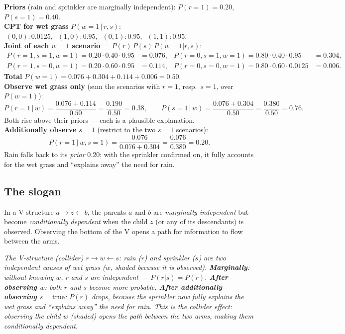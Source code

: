 \documentclass[11pt, a4paper]{article}
\begin{document}
\begin{exbox}
\textbf{Priors} (rain and sprinkler are marginally independent):
$P(r{=}1)=0.20$, $P(s{=}1)=0.40$.\\[0.2em]
\textbf{CPT for wet grass} $P(w{=}1\,|\,r,s)$:
$\;(0,0)\!: 0.0125,\;\;(1,0)\!: 0.95,\;\;(0,1)\!: 0.95,\;\;(1,1)\!: 0.95$.\\[0.3em]
\textbf{Joint of each $w{=}1$ scenario} $= P(r)\,P(s)\,P(w{=}1|r,s)$:
\[
\begin{array}{llll}
P(r{=}1,s{=}1,w{=}1)=0.20\cdot0.40\cdot0.95 &=0.076, &
P(r{=}0,s{=}1,w{=}1)=0.80\cdot0.40\cdot0.95 &=0.304,\\
P(r{=}1,s{=}0,w{=}1)=0.20\cdot0.60\cdot0.95 &=0.114, &
P(r{=}0,s{=}0,w{=}1)=0.80\cdot0.60\cdot0.0125 &=0.006.
\end{array}
\]
\textbf{Total} $P(w{=}1)=0.076+0.304+0.114+0.006=0.50$.\\[0.3em]
\textbf{Observe wet grass only} (sum the scenarios with $r{=}1$, resp.\ $s{=}1$, over $P(w{=}1)$):
\[
P(r{=}1\,|\,w)=\frac{0.076+0.114}{0.50}=\frac{0.190}{0.50}=0.38, \qquad
P(s{=}1\,|\,w)=\frac{0.076+0.304}{0.50}=\frac{0.380}{0.50}=0.76.
\]
Both rise above their priors — each is a plausible explanation.\\[0.3em]
\textbf{Additionally observe $s{=}1$} (restrict to the two $s{=}1$ scenarios):
\[
P(r{=}1\,|\,w,s{=}1)=\frac{0.076}{0.076+0.304}=\frac{0.076}{0.380}=0.20.
\]
Rain falls back to its \emph{prior} $0.20$: with the sprinkler confirmed on, it fully accounts for the
wet grass and ``explains away'' the need for rain.
\end{exbox}

\subsection{The slogan}

\begin{defbox}
In a V-structure $a \to z \leftarrow b$, the parents $a$ and $b$ are \emph{marginally independent} but become \emph{conditionally dependent} when the child $z$ (or any of its descendants) is observed. Observing the bottom of the V opens a path for information to flow between the arms.
\end{defbox}

\begin{center}

\footnotesize\textit{The V-structure (collider) $r \to w \leftarrow s$: rain ($r$) and sprinkler ($s$) are two independent causes of wet grass ($w$, shaded because it is observed). \textbf{Marginally}: without knowing $w$, $r$ and $s$ are independent --- $P(r|s)=P(r)$. \textbf{After observing $w$}: both $r$ and $s$ become more probable. \textbf{After additionally observing $s=\mathrm{true}$}: $P(r)$ drops, because the sprinkler now fully explains the wet grass and ``explains away'' the need for rain. This is the collider effect: observing the child $w$ (shaded) opens the path between the two arms, making them conditionally dependent.}
\end{center}
\end{document}
